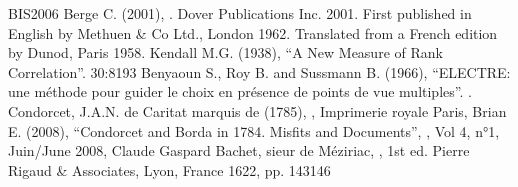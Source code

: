 \documentclass[a4paper,12pt,english]{sphinxhowto}
\begin{document}
\begin{sphinxthebibliography}{BIS\sphinxhyphen{}2006}
\sphinxAtStartPar
Berge C. (2001), . Dover Publications Inc. 2001. First published in English by Methuen \& Co Ltd., London 1962. Translated from a French edition by Dunod, Paris 1958.
\sphinxAtStartPar
Kendall M.G. (1938), “A New Measure of Rank Correlation”.  30:81\textendash{}93
\sphinxAtStartPar
Benyaoun S., Roy B. and Sussmann B. (1966), “ELECTRE: une méthode pour guider le choix en présence de points de vue multiples”. .
\sphinxAtStartPar
Condorcet, J.A.N. de Caritat marquis de (1785), , Imprimerie royale Paris, 
\sphinxAtStartPar
Brian E. (2008), “Condorcet and Borda in 1784. Misfits and Documents”, , Vol 4, n°1, Juin/June 2008, 
\sphinxAtStartPar
Claude Gaspard Bachet, sieur de Méziriac,  , 1st ed. Pierre Rigaud \& Associates, Lyon, France 1622, pp. 143\sphinxhyphen{}146
\end{sphinxthebibliography}



\renewcommand{\indexname}{Index}
\printindex
\end{document}

